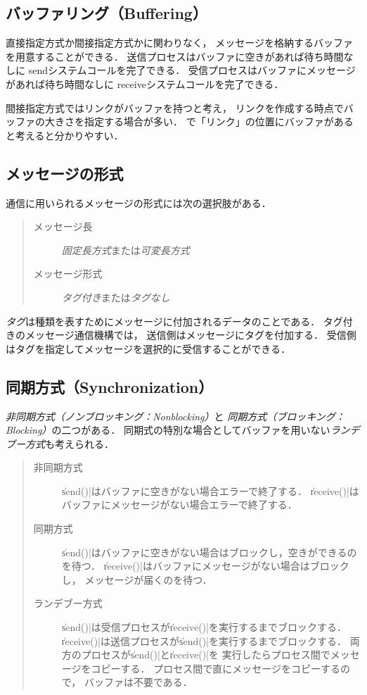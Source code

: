 \subsection{バッファリング（Buffering）}
直接指定方式か間接指定方式かに関わりなく，
メッセージを格納するバッファを用意することができる．
送信プロセスはバッファに空きがあれば待ち時間なしに
sendシステムコールを完了できる．
受信プロセスはバッファにメッセージがあれば待ち時間なしに
receiveシステムコールを完了できる．

間接指定方式ではリンクがバッファを持つと考え，
リンクを作成する時点でバッファの大きさを指定する場合が多い．
で「リンク」の位置にバッファがあると考えると分かりやすい．

\subsection{メッセージの形式}
通信に用いられるメッセージの形式には次の選択肢がある．

\begin{quote}
  \begin{description}
  \item [メッセージ長] \emph{固定長方式}または\emph{可変長方式}
  \item [メッセージ形式] \emph{タグ付き}または\emph{タグなし}
  \end{description}
\end{quote}

\emph{タグ}は種類を表すためにメッセージに付加されるデータのことである．
タグ付きのメッセージ通信機構では，
送信側はメッセージにタグを付加する．
受信側はタグを指定してメッセージを選択的に受信することができる．

\subsection{同期方式（Synchronization）}
\emph{非同期方式（ノンブロッキング：Nonblocking）}と
\emph{同期方式（ブロッキング：Blocking）}の二つがある．
同期式の特別な場合としてバッファを用いない\emph{ランデブー方式}も考えられる．

\begin{quote}
  \begin{description}
  \item [非同期方式]
    \|send()|はバッファに空きがない場合エラーで終了する．
    \|receive()|はバッファにメッセージがない場合エラーで終了する．
  \item [同期方式]
    \|send()|はバッファに空きがない場合はブロックし，空きができるのを待つ．
    \|receive()|はバッファにメッセージがない場合はブロックし，
    メッセージが届くのを待つ．
  \item [ランデブー方式]
    \|send()|は受信プロセスが\|receive()|を実行するまでブロックする．
    \|receive()|は送信プロセスが\|send()|を実行するまでブロックする．
    両方のプロセスが\|send()|と\|receive()|を
    実行したらプロセス間でメッセージをコピーする．
    プロセス間で直にメッセージをコピーするので，
    バッファは不要である．
  \end{description}
\end{quote}

